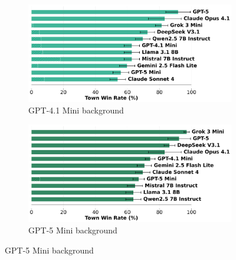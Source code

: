 \documentclass{article}
\begin{document}
\begin{figure}[htbp]
    \centering
    \begin{subfigure}[b]{0.48\textwidth}
        \centering
        \includegraphics[width=\textwidth]{../results/villager_gpt-4.1_mini_db_benchmark.png}
        \caption{GPT-4.1 Mini background}
        \label{fig:villager_gpt41mini_appendix}
    \end{subfigure}
    \hfill
    \begin{subfigure}[b]{0.48\textwidth}
        \centering
        \includegraphics[width=\textwidth]{../results/villager_gpt-5_mini_db_benchmark.png}
        \caption{GPT-5 Mini background}
        \label{fig:villager_gpt5mini_appendix}
    \end{subfigure}
    
    \vspace{0.5cm}
    

\end{figure}
\end{document}
